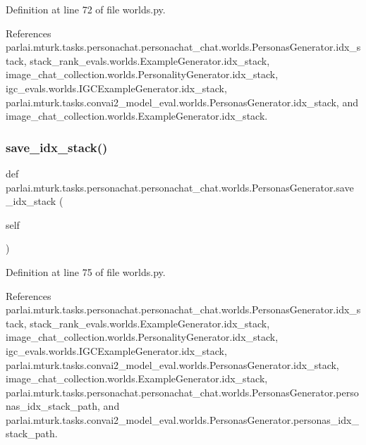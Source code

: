 Definition at line 72 of file worlds.\+py.



References parlai.\+mturk.\+tasks.\+personachat.\+personachat\+\_\+chat.\+worlds.\+Personas\+Generator.\+idx\+\_\+stack, stack\+\_\+rank\+\_\+evals.\+worlds.\+Example\+Generator.\+idx\+\_\+stack, image\+\_\+chat\+\_\+collection.\+worlds.\+Personality\+Generator.\+idx\+\_\+stack, igc\+\_\+evals.\+worlds.\+I\+G\+C\+Example\+Generator.\+idx\+\_\+stack, parlai.\+mturk.\+tasks.\+convai2\+\_\+model\+\_\+eval.\+worlds.\+Personas\+Generator.\+idx\+\_\+stack, and image\+\_\+chat\+\_\+collection.\+worlds.\+Example\+Generator.\+idx\+\_\+stack.

\mbox{\label{classparlai_1_1mturk_1_1tasks_1_1personachat_1_1personachat__chat_1_1worlds_1_1PersonasGenerator_a49c91f6d43cf77f815700b6837f0400d}} 
\subsubsection{\texorpdfstring{save\+\_\+idx\+\_\+stack()}{save\_idx\_stack()}}
{\footnotesize\ttfamily def parlai.\+mturk.\+tasks.\+personachat.\+personachat\+\_\+chat.\+worlds.\+Personas\+Generator.\+save\+\_\+idx\+\_\+stack (\begin{DoxyParamCaption}\item[{}]{self }\end{DoxyParamCaption})}



Definition at line 75 of file worlds.\+py.



References parlai.\+mturk.\+tasks.\+personachat.\+personachat\+\_\+chat.\+worlds.\+Personas\+Generator.\+idx\+\_\+stack, stack\+\_\+rank\+\_\+evals.\+worlds.\+Example\+Generator.\+idx\+\_\+stack, image\+\_\+chat\+\_\+collection.\+worlds.\+Personality\+Generator.\+idx\+\_\+stack, igc\+\_\+evals.\+worlds.\+I\+G\+C\+Example\+Generator.\+idx\+\_\+stack, parlai.\+mturk.\+tasks.\+convai2\+\_\+model\+\_\+eval.\+worlds.\+Personas\+Generator.\+idx\+\_\+stack, image\+\_\+chat\+\_\+collection.\+worlds.\+Example\+Generator.\+idx\+\_\+stack, parlai.\+mturk.\+tasks.\+personachat.\+personachat\+\_\+chat.\+worlds.\+Personas\+Generator.\+personas\+\_\+idx\+\_\+stack\+\_\+path, and parlai.\+mturk.\+tasks.\+convai2\+\_\+model\+\_\+eval.\+worlds.\+Personas\+Generator.\+personas\+\_\+idx\+\_\+stack\+\_\+path.




